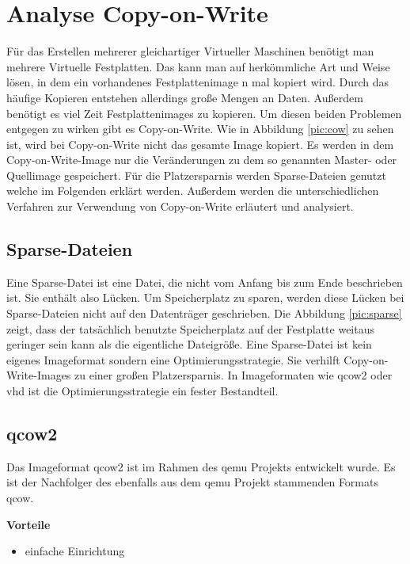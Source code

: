 \chapter{Analyse Copy-on-Write}
Für das Erstellen mehrerer gleichartiger Virtueller Maschinen benötigt man mehrere Virtuelle Festplatten. Das kann man auf herkömmliche Art und Weise lösen, in dem ein vorhandenes Festplattenimage n mal kopiert wird. Durch das häufige Kopieren entstehen allerdings große Mengen an Daten. Außerdem benötigt es viel Zeit Festplattenimages zu kopieren. Um diesen beiden Problemen entgegen zu wirken gibt es Copy-on-Write. Wie in Abbildung \ref{pic:cow} zu sehen ist, wird bei Copy-on-Write nicht das gesamte Image kopiert. Es werden in dem Copy-on-Write-Image nur die Veränderungen zu dem so genannten Master- oder Quellimage gespeichert. Für die Platzersparnis werden Sparse-Dateien genutzt welche im Folgenden erklärt werden. Außerdem werden die unterschiedlichen Verfahren zur Verwendung von Copy-on-Write erläutert und analysiert.


\section{Sparse-Dateien}
Eine Sparse-Datei ist eine Datei, die nicht vom Anfang bis zum Ende beschrieben ist. Sie enthält also Lücken. Um Speicherplatz zu sparen, werden diese Lücken bei Sparse-Dateien nicht auf den Datenträger geschrieben. Die Abbildung \ref{pic:sparse} zeigt, dass der tatsächlich benutzte Speicherplatz auf der Festplatte weitaus geringer sein kann als die eigentliche Dateigröße. Eine Sparse-Datei ist kein eigenes Imageformat sondern eine Optimierungsstrategie. Sie verhilft Copy-on-Write-Images zu einer großen Platzersparnis. In Imageformaten wie qcow2 oder vhd ist die Optimierungsstrategie ein fester Bestandteil. \cite{sparse}


\section{qcow2}
Das Imageformat qcow2 ist im Rahmen des qemu Projekts entwickelt wurde. Es ist der Nachfolger des ebenfalls aus dem qemu Projekt stammenden Formats qcow. \cite{qcowmarkmc} \cite{qemuwiki}

\textbf{Vorteile}
\begin{itemize}
 \item einfache Einrichtung
\end{itemize}

